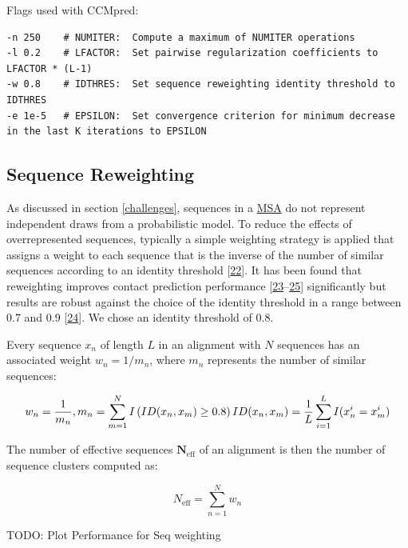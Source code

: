 \documentclass[12pt,a4paper,twoside]{book}
\newcommand{\neff}{N_\mathrm{eff}}
\theoremstyle{definition}
\theoremstyle{definition}
\theoremstyle{remark}
\begin{document}
Flags used with CCMpred:

\begin{verbatim}
-n 250    # NUMITER:  Compute a maximum of NUMITER operations
-l 0.2    # LFACTOR:  Set pairwise regularization coefficients to LFACTOR * (L-1) 
-w 0.8    # IDTHRES:  Set sequence reweighting identity threshold to IDTHRES
-e 1e-5   # EPSILON:  Set convergence criterion for minimum decrease in the last K iterations to EPSILON
\end{verbatim}

\subsection{Sequence Reweighting}\label{seq-reweighting}

As discussed in section \ref{challenges}, sequences in a
\protect\hyperlink{abbrev}{MSA} do not represent independent draws from
a probabilistic model. To reduce the effects of overrepresented
sequences, typically a simple weighting strategy is applied that assigns
a weight to each sequence that is the inverse of the number of similar
sequences according to an identity threshold
{[}\protect\hyperlink{ref-Stein2015a}{22}{]}. It has been found that
reweighting improves contact prediction performance
{[}\protect\hyperlink{ref-Buslje2009}{23}--\protect\hyperlink{ref-Jones2012}{25}{]}
significantly but results are robust against the choice of the identity
threshold in a range between 0.7 and 0.9
{[}\protect\hyperlink{ref-Morcos2011}{24}{]}. We chose an identity
threshold of 0.8.

Every sequence \(x_n\) of length \(L\) in an alignment with \(N\)
sequences has an associated weight \(w_n = 1/m_n\), where \(m_n\)
represents the number of similar sequences:

\begin{equation} 
  w_n = \frac{1}{m_n}, m_n = \sum_{m=1}^N I \left( ID(x_n, x_m) \geq 0.8 \right) \\
  ID(x_n, x_m)=\frac{1}{L} \sum_{i=1}^L I(x_n^i = x_m^i)
  \label{eq:seqweight}
\end{equation}

The number of effective sequences \(\mathbf{\neff}\) of an alignment is
then the number of sequence clusters computed as:

\begin{equation} 
  \neff = \sum_{n=1}^N w_n
  \label{eq:neff}
\end{equation}

TODO: Plot Performance for Seq weighting
\end{document}
